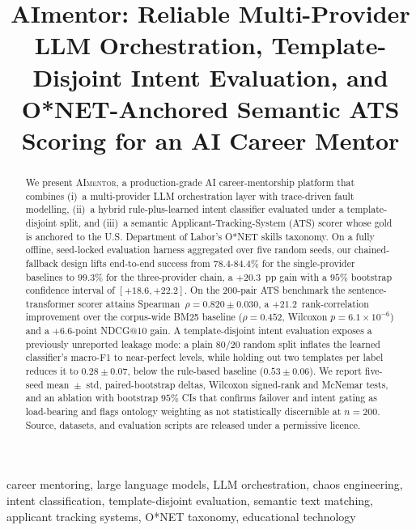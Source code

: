 \documentclass[conference]{IEEEtran}
\begin{document}
\title{AImentor: Reliable Multi-Provider LLM Orchestration, Template-Disjoint
Intent Evaluation, and O*NET-Anchored Semantic ATS Scoring for an AI Career
Mentor}

\author{%
}

\maketitle

\begin{abstract}
We present \textsc{AImentor}, a production-grade AI career-mentorship
platform that combines (i)~a multi-provider LLM orchestration layer with
trace-driven fault modelling, (ii)~a hybrid rule-plus-learned intent
classifier evaluated under a template-disjoint split, and (iii)~a semantic
Applicant-Tracking-System (ATS) scorer whose gold is anchored to the U.S.
Department of Labor's O*NET skills taxonomy. On a fully offline,
seed-locked evaluation harness aggregated over five random seeds, our
chained-fallback design lifts end-to-end success from $78.4$-$84.4\%$ for
the single-provider baselines to $99.3\%$ for the three-provider chain, a
$+20.3$~pp gain with a $95\%$ bootstrap confidence interval of
$[+18.6, +22.2]$. On the $200$-pair ATS benchmark the
sentence-transformer scorer attains Spearman~$\rho=0.820\pm0.030$, a
$+21.2$~rank-correlation improvement over the corpus-wide BM25 baseline
($\rho=0.452$, Wilcoxon $p=6.1\!\times\!10^{-6}$) and a $+6.6$-point
NDCG$@10$ gain. A template-disjoint intent evaluation exposes a
previously unreported leakage mode: a plain $80/20$ random split inflates
the learned classifier's macro-F1 to near-perfect levels, while holding
out two templates per label reduces it to $0.28\pm0.07$, below the
rule-based baseline ($0.53\pm0.06$). We report five-seed mean~$\pm$~std,
paired-bootstrap deltas, Wilcoxon signed-rank and McNemar tests, and an
ablation with bootstrap $95\%$ CIs that confirms failover and intent
gating as load-bearing and flags ontology weighting as not statistically
discernible at $n=200$. Source, datasets, and evaluation scripts are
released under a permissive licence.
\end{abstract}

\begin{IEEEkeywords}
career mentoring, large language models, LLM orchestration,
chaos engineering, intent classification, template-disjoint evaluation,
semantic text matching, applicant tracking systems,
O*NET taxonomy, educational technology
\end{IEEEkeywords}
\end{document}
